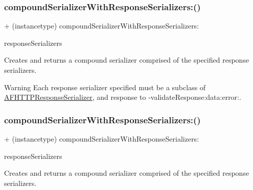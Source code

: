 \subsubsection{\texorpdfstring{compound\+Serializer\+With\+Response\+Serializers\+:()}{compoundSerializerWithResponseSerializers:()}\hspace{0.1cm}{\footnotesize\ttfamily [2/3]}}
{\footnotesize\ttfamily + (instancetype) compound\+Serializer\+With\+Response\+Serializers\+: \begin{DoxyParamCaption}\item[{(N\+S\+Array $\ast$)}]{response\+Serializers }\end{DoxyParamCaption}}

Creates and returns a compound serializer comprised of the specified response serializers.

\begin{DoxyWarning}{Warning}
Each response serializer specified must be a subclass of {\ttfamily \mbox{\hyperlink{interface_a_f_h_t_t_p_response_serializer}{A\+F\+H\+T\+T\+P\+Response\+Serializer}}}, and response to {\ttfamily -\/validate\+Response\+:data\+:error\+:}. 
\end{DoxyWarning}
\mbox{\label{interface_a_f_compound_response_serializer_a48bf2d3d5a18d9cc73b6e29ef30c6e56}} 
\subsubsection{\texorpdfstring{compound\+Serializer\+With\+Response\+Serializers\+:()}{compoundSerializerWithResponseSerializers:()}\hspace{0.1cm}{\footnotesize\ttfamily [3/3]}}
{\footnotesize\ttfamily + (instancetype) compound\+Serializer\+With\+Response\+Serializers\+: \begin{DoxyParamCaption}\item[{(N\+S\+Array $\ast$)}]{response\+Serializers }\end{DoxyParamCaption}}

Creates and returns a compound serializer comprised of the specified response serializers.

